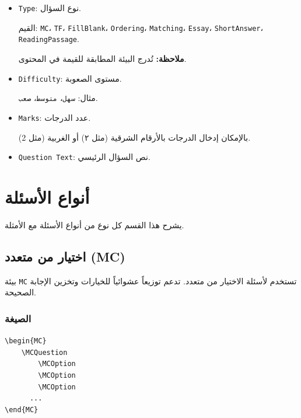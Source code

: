 \documentclass[a4paper]{article}
\newcommand{\engtt}[1]{\textenglish{\texttt{#1}}}
\begin{document}
\begin{itemize}
    \item \engtt{Type}: نوع السؤال.\par
          القيم: \engtt{MC}، \engtt{TF}، \engtt{FillBlank}، \engtt{Ordering}، \engtt{Matching}، \engtt{Essay}، \engtt{ShortAnswer}، \engtt{ReadingPassage}.\par
          \textbf{ملاحظة:} تُدرج البيئة المطابقة للقيمة في المحتوى.
    
    \item \engtt{Difficulty}: مستوى الصعوبة.\par
          مثال: \texttt{سهل}، \texttt{متوسط}، \texttt{صعب}.
    
    \item \engtt{Marks}: عدد الدرجات.\par
    بالإمكان إدخال الدرجات بالأرقام الشرقية (مثل ٢) أو الغربية (مثل 2).
    
    \item \engtt{Question Text}: نص السؤال الرئيسي.
\end{itemize}

\section{أنواع الأسئلة}

يشرح هذا القسم كل نوع من أنواع الأسئلة مع الأمثلة.

\subsection{اختيار من متعدد (MC)}

بيئة \engtt{MC} تستخدم لأسئلة الاختيار من متعدد. تدعم توزيعاً عشوائياً للخيارات وتخزين الإجابة الصحيحة.

\subsubsection*{الصيغة}

\begin{LTR}\ttfamily
\verb|\begin{MC}|\\
\verb|    \MCQuestion|\\
\verb|        \MCOption|\\
\verb|        \MCOption|\\
\verb|        \MCOption|\\
\verb|      ...|\\
\verb|\end{MC}|
\end{LTR}
\end{document}

